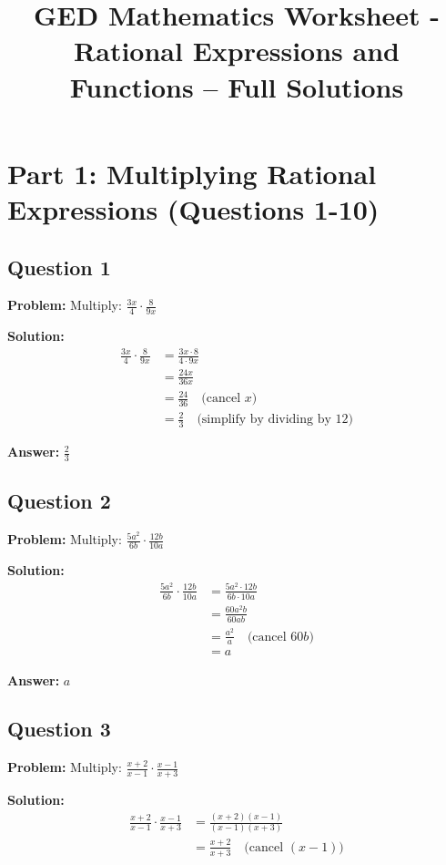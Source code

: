 \documentclass[12pt]{article}
\title{GED Mathematics Worksheet - Rational Expressions and Functions -- Full Solutions}
\author{}
\date{}
\begin{document}
\maketitle

\section*{Part 1: Multiplying Rational Expressions (Questions 1-10)}

\subsection*{Question 1}
\textbf{Problem:} Multiply: $\frac{3x}{4} \cdot \frac{8}{9x}$

\textbf{Solution:}
\begin{align*}
\frac{3x}{4} \cdot \frac{8}{9x} &= \frac{3x \cdot 8}{4 \cdot 9x} \\
&= \frac{24x}{36x} \\
&= \frac{24}{36} \quad \text{(cancel } x \text{)} \\
&= \frac{2}{3} \quad \text{(simplify by dividing by 12)}
\end{align*}

\textbf{Answer:} $\boxed{\frac{2}{3}}$

\subsection*{Question 2}
\textbf{Problem:} Multiply: $\frac{5a^2}{6b} \cdot \frac{12b}{10a}$

\textbf{Solution:}
\begin{align*}
\frac{5a^2}{6b} \cdot \frac{12b}{10a} &= \frac{5a^2 \cdot 12b}{6b \cdot 10a} \\
&= \frac{60a^2b}{60ab} \\
&= \frac{a^2}{a} \quad \text{(cancel } 60b \text{)} \\
&= a
\end{align*}

\textbf{Answer:} $\boxed{a}$

\subsection*{Question 3}
\textbf{Problem:} Multiply: $\frac{x+2}{x-1} \cdot \frac{x-1}{x+3}$

\textbf{Solution:}
\begin{align*}
\frac{x+2}{x-1} \cdot \frac{x-1}{x+3} &= \frac{(x+2)(x-1)}{(x-1)(x+3)} \\
&= \frac{x+2}{x+3} \quad \text{(cancel } (x-1) \text{)} \\
\end{align*}
\end{document}
